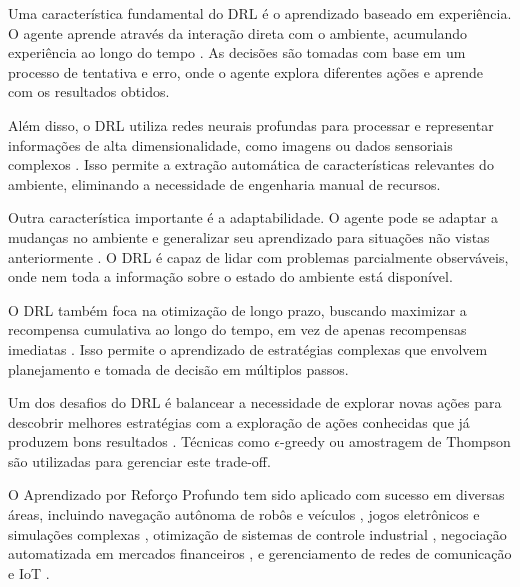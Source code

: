 Uma característica fundamental do DRL é o aprendizado baseado em experiência. O agente aprende através da interação direta com o ambiente, acumulando experiência ao longo do tempo \cite{Jesus2023AprendizadoPR, Grando2021AprendizadoPR}. As decisões são tomadas com base em um processo de tentativa e erro, onde o agente explora diferentes ações e aprende com os resultados obtidos.

Além disso, o DRL utiliza redes neurais profundas para processar e representar informações de alta dimensionalidade, como imagens ou dados sensoriais complexos \cite{Bezerra2021PropostaDC, Bezerra2023AprendizagemPR}. Isso permite a extração automática de características relevantes do ambiente, eliminando a necessidade de engenharia manual de recursos.

Outra característica importante é a adaptabilidade. O agente pode se adaptar a mudanças no ambiente e generalizar seu aprendizado para situações não vistas anteriormente \cite{Bezerra2021PropostaDC, Bezerra2023AprendizagemPR}. O DRL é capaz de lidar com problemas parcialmente observáveis, onde nem toda a informação sobre o estado do ambiente está disponível.

O DRL também foca na otimização de longo prazo, buscando maximizar a recompensa cumulativa ao longo do tempo, em vez de apenas recompensas imediatas \cite{Bezerra2021PropostaDC, Bezerra2023AprendizagemPR}. Isso permite o aprendizado de estratégias complexas que envolvem planejamento e tomada de decisão em múltiplos passos.

Um dos desafios do DRL é balancear a necessidade de explorar novas ações para descobrir melhores estratégias com a exploração de ações conhecidas que já produzem bons resultados \cite{Bezerra2021PropostaDC, Bezerra2023AprendizagemPR}. Técnicas como $\epsilon$-greedy ou amostragem de Thompson são utilizadas para gerenciar este trade-off.

O Aprendizado por Reforço Profundo tem sido aplicado com sucesso em diversas áreas, incluindo navegação autônoma de robôs e veículos \cite{Job2023TelemetriaAU, Kinoshita2022AprendizadoPR}, jogos eletrônicos e simulações complexas \cite{Jesus2023AprendizadoPR, Grando2021AprendizadoPR}, otimização de sistemas de controle industrial \cite{Bezerra2021PropostaDC, Bezerra2023AprendizagemPR}, negociação automatizada em mercados financeiros \cite{Bezerra2021PropostaDC, Bezerra2023AprendizagemPR}, e gerenciamento de redes de comunicação e IoT \cite{Bezerra2021PropostaDC, Bezerra2023AprendizagemPR}.

